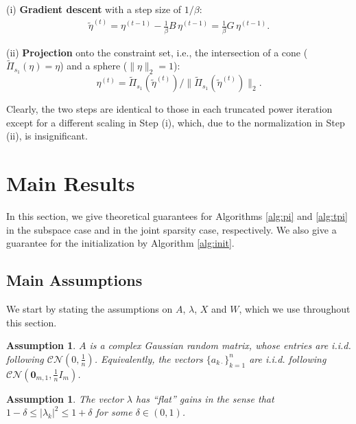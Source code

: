 \documentclass[11pt,journal]{IEEEtran}
\newcommand{\calCN}{\mathcal{CN}}
\newcommand{\norm}[1]{\|{#1}\|}
\newtheorem{assumption}[theorem]{Assumption}
\begin{document}
\noindent(i) \textbf{Gradient descent} with a step size of $1/\beta$:
\begin{align*}
\tilde{\eta}^{(t)} = \eta^{(t-1)} - \frac{1}{\beta} B\, \eta^{(t-1)} = \frac{1}{\beta} G \, \eta^{(t-1)}.
\end{align*}

\noindent(ii) \textbf{Projection} onto the constraint set, i.e., the intersection of a cone ($\widetilde{\Pi}_{s_1}(\eta) = \eta$) and a sphere ($\norm{\eta}_2 = 1$):
\[
\eta^{(t)} = \widetilde{\Pi}_{s_1}(\tilde{\eta}^{(t)})/\norm{\widetilde{\Pi}_{s_1}(\tilde{\eta}^{(t)})}_2.
\]

Clearly, the two steps are identical to those in each truncated power iteration except for a different scaling in Step (i), which, due to the normalization in Step (ii), is insignificant. 



\section{Main Results} \label{sec:main}
In this section, we give theoretical guarantees for Algorithms \ref{alg:pi} and \ref{alg:tpi} in the subspace case and in the joint sparsity case, respectively. We also give a guarantee for the initialization by Algorithm \ref{alg:init}.

\subsection{Main Assumptions} \label{sec:assumption}
We start by stating the assumptions on $A$, $\lambda$, $X$ and $W$, which we use throughout this section. 

\begin{assumption} \label{ass:A}
$A$ is a complex Gaussian random matrix, whose entries are i.i.d. following $\calCN(0, \frac{1}{n})$. Equivalently, the vectors $\{a_{k\cdot}\}_{k=1}^{n}$ are i.i.d. following $\calCN(\bm{0}_{m,1}, \frac{1}{n}I_m)$.
\end{assumption}

\begin{assumption} \label{ass:lambda}
The vector $\lambda$ has ``flat'' gains in the sense that $1-\delta \leq |\lambda_k|^2 \leq 1+\delta$ for some $\delta \in (0,1)$.
\end{assumption}
\end{document}
